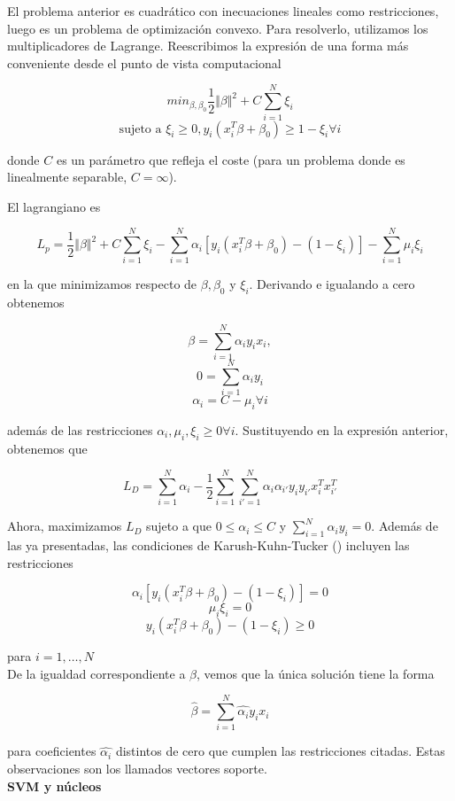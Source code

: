 El problema anterior es cuadrático con inecuaciones lineales como restricciones, luego es un problema de optimización convexo. Para resolverlo, utilizamos los multiplicadores de Lagrange. Reescribimos la expresión de una forma más conveniente desde el punto de vista computacional

$$min_{\beta,\beta_0} \frac{1}{2} \Vert \beta \Vert^2 + C \sum_{i=1}^{N} \xi_i$$
$$\text{sujeto a } \xi_i \geq 0, y_i(x_i^T \beta + \beta_0) \geq 1- \xi_i \forall i$$

donde $C$ es un parámetro que refleja el coste (para un problema donde es linealmente separable, $C= \infty$).

El lagrangiano es

$$L_p = \frac{1}{2} \Vert \beta \Vert^2 + C \sum_{i=1}^{N} \xi_i - \sum_{i=1}^{N}\alpha_i[y_i(x_i^T \beta + \beta_0)-(1-\xi_i)] - \sum_{i=1}^{N} \mu_i \xi_i$$

en la que minimizamos respecto de $\beta, \beta_0$ y $\xi_i$. Derivando e igualando a cero obtenemos

$$\beta = \sum_{i=1}^{N} \alpha_i y_i x_i,$$
$$0 = \sum_{i=1}^{N} \alpha_i y_i$$
$$\alpha_i = C-\mu_i \forall i$$

además de las restricciones $\alpha_i,\mu_i,\xi_i \geq 0 \forall i$. Sustituyendo en la expresión anterior, obtenemos que

$$L_D = \sum_{i=1}^{N}\alpha_i - \frac{1}{2}\sum_{i=1}^{N}\sum_{i'=1}^{N}\alpha_i \alpha_{i'} y_i y_{i'}x_i^T x_{i'}^T$$

Ahora, maximizamos $L_D$ sujeto a que $0 \leq \alpha_i \leq C$ y $\sum_{i=1}^{N} \alpha_i y_i=0$. Además de las ya presentadas, las condiciones de Karush-Kuhn-Tucker (\cite{kkt}) incluyen las restricciones

$$\alpha_i[y_i(x_i^T \beta + \beta_0)-(1-\xi_i)] = 0$$
$$\mu_i \xi_i = 0$$
$$y_i(x_i^T \beta + \beta_0)-(1-\xi_i) \geq 0$$

para $i = 1,\dots, N$\\

De la igualdad correspondiente a $\beta$, vemos que la única solución tiene la forma

$$\hat{\beta} = \sum_{i=1}^{N} \hat{\alpha_i} y_i x_i$$

para coeficientes $\hat{\alpha_i}$ distintos de cero que cumplen las restricciones citadas. Estas observaciones son los llamados vectores soporte. \\ 

\textbf{SVM y núcleos}\\

